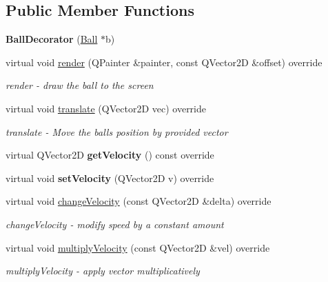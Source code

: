 \subsection*{Public Member Functions}
\begin{DoxyCompactItemize}
\item 
\mbox{\label{class_ball_decorator_a8ba466927a1d9eb97ee0094a11b5596c}} 
{\bfseries Ball\+Decorator} (\mbox{\hyperlink{class_ball}{Ball}} $\ast$b)
\item 
virtual void \mbox{\hyperlink{class_ball_decorator_af8205f8033b2490ecd3365c24ff5cdeb}{render}} (Q\+Painter \&painter, const Q\+Vector2D \&offset) override
\begin{DoxyCompactList}\small\item\em render -\/ draw the ball to the screen \end{DoxyCompactList}\item 
virtual void \mbox{\hyperlink{class_ball_decorator_aae30ba0b71629db797e0ea2639c5e32d}{translate}} (Q\+Vector2D vec) override
\begin{DoxyCompactList}\small\item\em translate -\/ Move the ball\textquotesingle{}s position by provided vector \end{DoxyCompactList}\item 
\mbox{\label{class_ball_decorator_aa2123d7419801968b7fce98e546397b7}} 
virtual Q\+Vector2D {\bfseries get\+Velocity} () const override
\item 
\mbox{\label{class_ball_decorator_aae01d9541d78d1a679ace63127aacd69}} 
virtual void {\bfseries set\+Velocity} (Q\+Vector2D v) override
\item 
virtual void \mbox{\hyperlink{class_ball_decorator_a3e4f4d31f6409f018b8b337bcf2bd284}{change\+Velocity}} (const Q\+Vector2D \&delta) override
\begin{DoxyCompactList}\small\item\em change\+Velocity -\/ modify speed by a constant amount \end{DoxyCompactList}\item 
virtual void \mbox{\hyperlink{class_ball_decorator_ad1a9139a5c41d17d0eebf007afb984e7}{multiply\+Velocity}} (const Q\+Vector2D \&vel) override
\begin{DoxyCompactList}\small\item\em multiply\+Velocity -\/ apply vector multiplicatively \end{DoxyCompactList}\item 

\end{DoxyCompactItemize}

